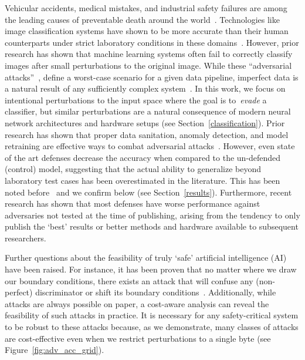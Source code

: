 \documentclass[lettersize,journal]{IEEEtran}
\begin{document}
Vehicular accidents, medical mistakes, and industrial safety failures are among the leading causes of preventable death around the world~\cite{OECD, makary2016medical, icoh}. Technologies like image classification systems have shown to be more accurate than their human counterparts under strict laboratory conditions in these domains~\cite{nhtsa, pakdemirli2019artificial, bernal2017safety++}. However, prior research has shown that machine learning systems often fail to correctly classify images after small perturbations to the original image. While these ``adversarial attacks''~\cite{chakraborty_adversarial_2018, biggio_evasion_2013-1}, define a worst-case scenario for a given data pipeline, imperfect data is a natural result of any sufficiently complex system~\cite{pearson2005mining}. In this work, we focus on intentional perturbations to the input space where the goal is to~\emph{evade} a classifier, but similar perturbations are a natural consequence of modern neural network architectures and hardware setups (see Section~\ref{classification}). Prior research has shown that proper data sanitation, anomaly detection, and model retraining are effective ways to combat adversarial attacks~\cite{chakraborty_adversarial_2018,  grigorescu2020survey, li_general_2016, wang_security_2019}. However, even state of the art defenses decrease the accuracy when compared to the un-defended (control) model, suggesting that the actual ability to generalize beyond laboratory test cases has been overestimated in the literature. This has been noted before~\cite{ biggio_evasion_2013, carlini_towards_2017, wang_security_2019, li_general_2016} and we confirm below (see Section~\ref{results}). Furthermore, recent research \cite{croce_reliable_2020} has shown that most defenses have worse performance against adversaries not tested at the time of publishing, arising from the tendency to only publish the `best' results or better methods and hardware available to subsequent researchers.

Further questions about the feasibility of truly `safe' artificial intelligence (AI) have been raised. For instance, it has been proven that no matter where we draw our boundary conditions, there exists an attack that will confuse any (non-perfect) discriminator or shift its boundary conditions~\cite{dohmatob_generalized_2019}. Additionally, while attacks are always possible on paper, a cost-aware analysis can reveal the feasibility of such attacks in practice. It is necessary for any safety-critical system to be robust to these attacks because, as we demonstrate, many classes of attacks are cost-effective even when we restrict perturbations to a single byte (see Figure~\ref{fig:adv_acc_grid}).
\end{document}
